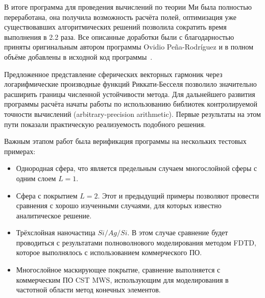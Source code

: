 В итоге программа для проведения вычислений по теории Ми была полностью
переработана, она получила возможность расчёта полей, оптимизация уже
существовавших алгоритмических решений позволила сократить время
выполнения в 2.2 раза.  Все описанные доработки были с благодарностью
приняты оригинальным автором программы Ovidio Pe\~{n}a-Rodr\'{i}guez и
в полном объёме добавлены в исходной код
программы~\cite{Scattnlay-web}.

Предложенное представление сферических векторных гармоник через
логарифмические производные функций Риккати-Бесселя позволило
значительно расширить границы численной устойчивости метода.  Для
дальнейшего развития программы расчёта начаты работы по использованию
библиотек контролируемой точности вычислений (arbitrary-precision
arithmetic).  Первые результаты на этом пути показали практическую
реализуемость подобного решения.


Важным этапом работ была верификация программы на нескольких
тестовых примерах:
\begin{itemize}
\item Однородная сфера, что является предельным случаем многослойной
  сферы с одним слоем $L=1$.
\item Сфера с покрытием $L=2$. Этот и предыдущий примеры позволяют
  провести сравнения с хорошо изученными случаями, для которых
  известно аналитическое решение.
\item Трёхслойная наночастица $Si/Ag/Si$. В этом случае сравнение
  будет проводиться с результатами полноволнового моделирования
  методом FDTD, которое выполнялось с использованием коммерческого ПО.
\item Многослойное маскирующее покрытие, сравнение выполняется с
  коммерческим ПО CST MWS, использующим для моделирования в частотной
  области метод конечных элементов.
\end{itemize}

